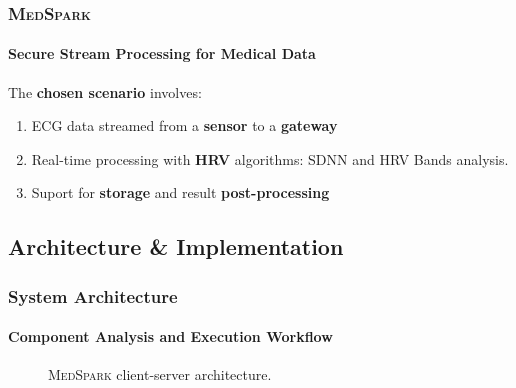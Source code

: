 \documentclass[10pt,    %
    english,            %
    xcolor=table,       %
    envcountsect,        %
    aspectratio=169     %
]{beamer}
\newcommand{\projName}{\textsc{MedSpark}\xspace}
\begin{document}
\begin{frame}
    \frametitle{\projName}
    \framesubtitle{Secure Stream Processing for Medical Data}


    The \textbf{chosen scenario} involves:
    \begin{enumerate}
        \item ECG data streamed from a \textbf{sensor} to a \textbf{gateway}
        \item Real-time processing with \textbf{HRV} algorithms: SDNN and HRV Bands analysis.
        \item Suport for \textbf{storage} and result \textbf{post-processing}
    \end{enumerate}


\end{frame}

\subsection{Architecture \& Implementation}

\begin{frame}
    \frametitle{System Architecture}
    \framesubtitle{Component Analysis and Execution Workflow}

    \begin{figure}[H]
        \centering
        \resizebox{0.9\linewidth}{!}{}
        \caption{\projName client-server architecture.}
        \label{fig:system-architecture}
    \end{figure}

\end{frame}
\end{document}
